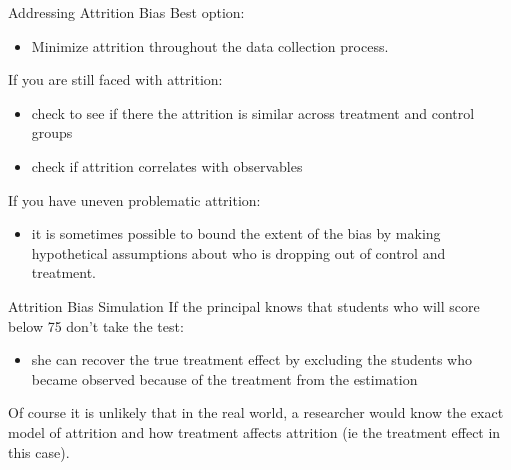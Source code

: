 \documentclass[
  ignorenonframetext,
]{beamer}
\providecommand{\tightlist}{%
  \setlength{\itemsep}{0pt}\setlength{\parskip}{0pt}}
\begin{document}
\begin{frame}{Addressing Attrition Bias}
\protect\hypertarget{addressing-attrition-bias}{}
Best option:

\begin{itemize}
\tightlist
\item
  Minimize attrition throughout the data collection process.
\end{itemize}

If you are still faced with attrition:

\begin{itemize}
\item
  check to see if there the attrition is similar across treatment and
  control groups
\item
  check if attrition correlates with observables
\end{itemize}

If you have uneven problematic attrition:

\begin{itemize}
\tightlist
\item
  it is sometimes possible to bound the extent of the bias by making
  hypothetical assumptions about who is dropping out of control and
  treatment.
\end{itemize}
\end{frame}

\begin{frame}{Attrition Bias Simulation}
\protect\hypertarget{attrition-bias-simulation-2}{}
If the principal knows that students who will score below 75 don't take
the test:

\begin{itemize}
\tightlist
\item
  she can recover the true treatment effect by excluding the students
  who became observed because of the treatment from the estimation
\end{itemize}

Of course it is unlikely that in the real world, a researcher would know
the exact model of attrition and how treatment affects attrition (ie the
treatment effect in this case).
\end{frame}
\end{document}
